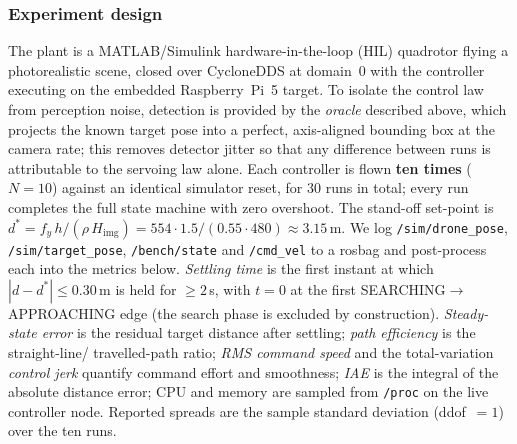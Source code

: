 \subsubsection{Experiment design}
\label{sec:vs_design}
The plant is a MATLAB/Simulink hardware-in-the-loop (HIL) quadrotor flying a
photorealistic scene, closed over CycloneDDS at domain~0 with the controller
executing on the embedded Raspberry~Pi~5 target. To isolate the control law
from perception noise, detection is provided by the \emph{oracle} described
above, which projects the known target pose into a perfect, axis-aligned
bounding box at the camera rate; this removes detector jitter so that any
difference between runs is attributable to the servoing law alone. Each
controller is flown \textbf{ten times} ($N=10$) against an identical simulator
reset, for $30$ runs in total; every run completes the full state machine with
zero overshoot. The stand-off set-point is
$d^{*}=f_y\,h/( \rho\,H_{\mathrm{img}})=554\cdot1.5/(0.55\cdot480)\approx3.15$\,m.
We log \texttt{/sim/drone\_pose}, \texttt{/sim/target\_pose},
\texttt{/bench/state} and \texttt{/cmd\_vel}
to a rosbag and post-process each into the metrics below. \emph{Settling time}
is the first instant at which $|d-d^{*}|\le0.30$\,m is held for $\ge2$\,s, with
$t=0$ at the first SEARCHING$\rightarrow$APPROACHING edge (the search phase is
excluded by construction). \emph{Steady-state error} is the residual
target distance after settling; \emph{path efficiency} is the straight-line/
travelled-path ratio; \emph{RMS command speed} and the total-variation
\emph{control jerk} quantify command effort and smoothness; \emph{IAE} is the
integral of the absolute distance error; CPU and memory are sampled from
\texttt{/proc} on the live controller node. Reported spreads are the sample
standard deviation (ddof~$=1$) over the ten runs.

